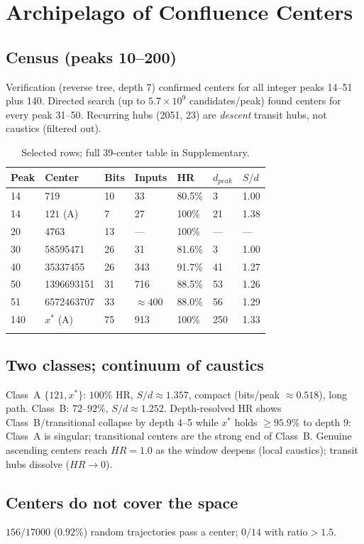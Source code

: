 \documentclass[12pt,a4paper]{article}
\theoremstyle{remark}
\begin{document}
\section{Archipelago of Confluence Centers}
\subsection{Census (peaks 10--200)}
Verification (reverse tree, depth 7) confirmed centers for all integer peaks
14--51 plus 140. Directed search (up to $5.7\times10^9$ candidates/peak) found
centers for every peak 31--50. Recurring hubs (2051, 23) are \emph{descent}
transit hubs, not caustics (filtered out).
\begin{longtable}{lllllll}
\toprule
\textbf{Peak} & \textbf{Center} & \textbf{Bits} & \textbf{Inputs} & \textbf{HR} & $d_{peak}$ & $S/d$ \\
\midrule
14 & 719 & 10 & 33 & 80.5\% & 3 & 1.00 \\
14 & $121$ (A) & 7 & 27 & 100\% & 21 & 1.38 \\
20 & 4763 & 13 & --- & 100\% & --- & --- \\
30 & 58595471 & 26 & 31 & 81.6\% & 3 & 1.00 \\
40 & 35337455 & 26 & 343 & 91.7\% & 41 & 1.27 \\
50 & 1396693151 & 31 & 716 & 88.5\% & 53 & 1.26 \\
51 & 6572463707 & 33 & $\approx400$ & 88.0\% & 56 & 1.29 \\
140 & $x^*$ (A) & 75 & 913 & 100\% & 250 & 1.33 \\
\bottomrule
\caption*{Selected rows; full 39-center table in Supplementary.}
\end{longtable}
\subsection{Two classes; continuum of caustics}
Class~A $\{121,x^*\}$: $100\%$ HR, $S/d\approx1.357$, compact (bits/peak
$\approx0.518$), long path. Class~B: $72$--$92\%$, $S/d\approx1.252$.
Depth-resolved HR shows Class~B/transitional collapse by depth 4--5 while $x^*$
holds $\ge95.9\%$ to depth 9: Class~A is singular; transitional centers are the
strong end of Class~B. Genuine ascending centers reach $HR=1.0$ as the window
deepens (local caustics); transit hubs dissolve ($HR\to0$).
\subsection{Centers do not cover the space}
$156/17000$ ($0.92\%$) random trajectories pass a center; $0/14$ with ratio$>1.5$.
\end{document}
